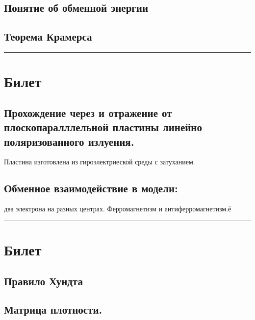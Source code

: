 \documentclass[a4paper, 14pt, russian]{article}
\newcommand{\ihline}{\noindent\rule{\textwidth}{1pt}}
\begin{document}
		\subsection{Понятие об обменной энергии}
		\subsection{Теорема Крамерса}

	\ihline

	\section{Билет}
		\subsection{Прохождение через и отражение от
		плоскопаралллельной пластины линейно поляризованного 
		излуения.}
		Пластина изготовлена из гироэлектриеской среды 
		с затуханием.
		\subsection{Обменное взаимодействие в модели:}
		два электрона на разных центрах. Ферромагнетизм
		и антиферромагнетизм.ё

	\ihline

	\section{Билет}
		\subsection{Правило Хундта}
		\subsection{Матрица плотности.}


	
\end{document}
